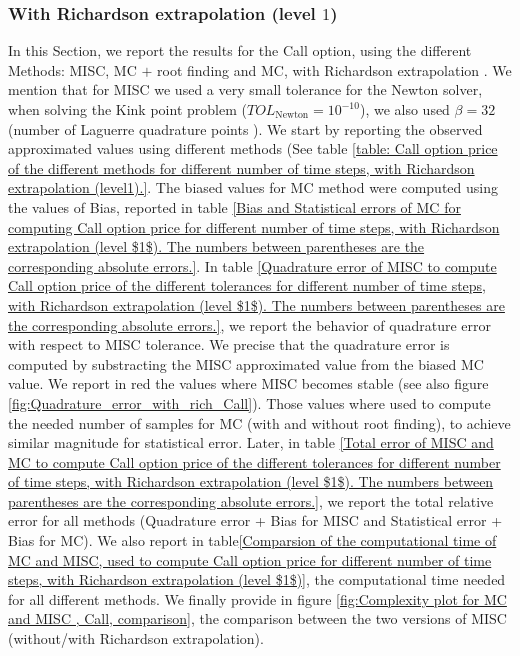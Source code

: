 \documentclass[11pt]{article}
\begin{document}
\FloatBarrier

\subsubsection*{With Richardson extrapolation (level $1$)}




In this Section, we report the results for the Call option, using the different Methods: MISC, MC $+$ root finding  and MC, with Richardson extrapolation . We mention that for MISC we used a very small tolerance for the Newton solver, when solving the Kink point problem ($TOL_{\text{Newton}}=10^{-10}$), we also used $\beta=32$ (number of Laguerre quadrature points ). We start by reporting the observed approximated values using different methods (See table \ref{table: Call option price of the different methods for different number of time steps, with Richardson extrapolation (level1).}. The biased values for MC method were computed using the values of Bias, reported in table \ref{Bias and Statistical errors of MC  for computing Call option price  for different number of time steps, with Richardson extrapolation (level $1$). The numbers between parentheses are the corresponding absolute errors.}. In table \ref{Quadrature error of MISC to compute Call option price of the different tolerances for different number of time steps, with Richardson extrapolation (level $1$). The numbers between parentheses are the corresponding absolute errors.}, we report the behavior of quadrature error with respect to MISC tolerance. We precise that the quadrature error is computed by substracting the MISC approximated value from the biased MC value. We report in red the values where MISC becomes stable (see also figure \ref{fig:Quadrature_error_with_rich_Call}). Those values where used to compute the needed number of samples for MC (with and without root finding), to achieve similar magnitude  for statistical error. Later, in table \ref{Total error of MISC and MC to compute Call option price of the different tolerances for different number of time steps, with Richardson extrapolation (level $1$). The numbers between parentheses are the corresponding absolute errors.}, we report the total relative error for all methods (Quadrature error + Bias for MISC and Statistical error + Bias for MC). We also report in table\ref{Comparsion of the computational time of  MC and MISC, used to compute Call option price  for different number of time steps, with Richardson extrapolation (level $1$)}, the computational time needed for all different methods.  We finally provide in figure \ref{fig:Complexity plot for MC and MISC , Call, comparison}, the comparison between the two versions of MISC (without/with Richardson extrapolation).
\end{document}
